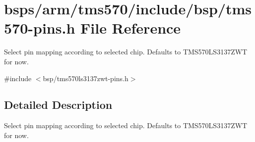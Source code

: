 \hypertarget{tms570-pins_8h}{}\section{bsps/arm/tms570/include/bsp/tms570-\/pins.h File Reference}
\label{tms570-pins_8h}


Select pin mapping according to selected chip. Defaults to T\+M\+S570\+L\+S3137\+Z\+WT for now.  


{\ttfamily \#include $<$bsp/tms570ls3137zwt-\/pins.\+h$>$}\newline


\subsection{Detailed Description}
Select pin mapping according to selected chip. Defaults to T\+M\+S570\+L\+S3137\+Z\+WT for now. 

